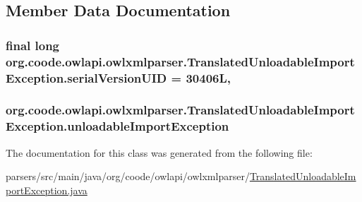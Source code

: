 \subsection{Member Data Documentation}
\hypertarget{classorg_1_1coode_1_1owlapi_1_1owlxmlparser_1_1_translated_unloadable_import_exception_aa8b9605e7bf40881fa239f7f3b116ef7}{
\subsubsection[{serial\-Version\-U\-I\-D}]{\setlength{\rightskip}{0pt plus 5cm}final long org.\-coode.\-owlapi.\-owlxmlparser.\-Translated\-Unloadable\-Import\-Exception.\-serial\-Version\-U\-I\-D = 30406\-L\hspace{0.3cm}{\ttfamily [static]}, {\ttfamily [private]}}}\label{classorg_1_1coode_1_1owlapi_1_1owlxmlparser_1_1_translated_unloadable_import_exception_aa8b9605e7bf40881fa239f7f3b116ef7}
\hypertarget{classorg_1_1coode_1_1owlapi_1_1owlxmlparser_1_1_translated_unloadable_import_exception_a732f116c12f1aa3cf32251362c3904f4}{
\subsubsection[{unloadable\-Import\-Exception}]{ org.\-coode.\-owlapi.\-owlxmlparser.\-Translated\-Unloadable\-Import\-Exception.\-unloadable\-Import\-Exception\hspace{0.3cm}{\ttfamily [private]}}}\label{classorg_1_1coode_1_1owlapi_1_1owlxmlparser_1_1_translated_unloadable_import_exception_a732f116c12f1aa3cf32251362c3904f4}


The documentation for this class was generated from the following file\-:\begin{DoxyCompactItemize}
\item 
parsers/src/main/java/org/coode/owlapi/owlxmlparser/\hyperlink{_translated_unloadable_import_exception_8java}{Translated\-Unloadable\-Import\-Exception.\-java}\end{DoxyCompactItemize}
